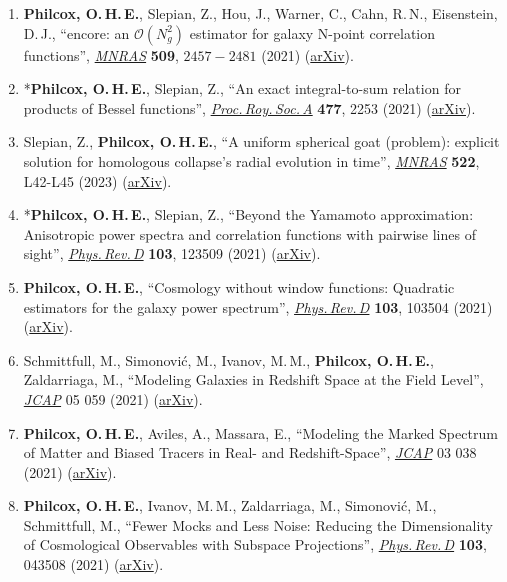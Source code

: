 \begin{enumerate}
    \item \textbf{Philcox, O.\,H.\,E.}, Slepian, Z., Hou, J., Warner, C., Cahn, R.\,N., Eisenstein, D.\,J., ``encore: an $\mathcal{O}(N_g^2)$ estimator for galaxy N-point correlation functions'', \href{https://doi.org/10.1093/mnras/stab3025}{\textit{MNRAS}} \textbf{509}, $2457-2481$ (2021) (\href{https://arxiv.org/abs/2105.08722}{arXiv}).
    \item *\textbf{Philcox, O.\,H.\,E.}, Slepian, Z., ``An exact integral-to-sum relation for products of Bessel functions'', \href{https://doi.org/10.1098/rspa.2021.0376}{\textit{Proc.\,Roy.\,Soc.\,A}} \textbf{477}, 2253 (2021) (\href{https://arxiv.org/abs/2104.10169}{arXiv}).
    \item Slepian, Z., \textbf{Philcox, O.\,H.\,E.}, ``A uniform spherical goat (problem): explicit solution for homologous collapse's radial evolution in time'', \href{https://doi.org/10.1093/mnrasl/slac153}{\textit{MNRAS}} \textbf{522}, L42-L45 (2023) (\href{https://arxiv.org/abs/2103.09823}{arXiv}).
    \item *\textbf{Philcox, O.\,H.\,E.}, Slepian, Z., ``Beyond the Yamamoto approximation: Anisotropic power spectra and correlation functions with pairwise lines of sight'', \href{https://doi.org/10.1103/PhysRevD.103.123509}{\textit{Phys.\,Rev.\,D}} \textbf{103}, 123509 (2021) (\href{https://arxiv.org/abs/2102.08384}{arXiv}).
    \item \textbf{Philcox, O.\,H.\,E.}, ``Cosmology without window functions: Quadratic estimators for the galaxy power spectrum'', \href{https://doi.org/10.1103/PhysRevD.103.103504}{\textit{Phys.\,Rev.\,D}} \textbf{103}, 103504 (2021) (\href{https://arxiv.org/abs/2012.09389}{arXiv}).
    \item Schmittfull, M., Simonovi\'c, M., Ivanov, M.\,M., \textbf{Philcox, O.\,H.\,E.}, Zaldarriaga, M., ``Modeling Galaxies in Redshift Space at the Field Level'', \href{https://doi.org/10.1088/1475-7516/2021/05/059}{\textit{JCAP}} 05 059 (2021) (\href{https://arxiv.org/abs/2012.03334}{arXiv}).
    \item \textbf{Philcox, O.\,H.\,E.}, Aviles, A., Massara, E., ``Modeling the Marked Spectrum of Matter and Biased Tracers in Real- and Redshift-Space'', \href{https://doi.org/10.1088/1475-7516/2021/03/038}{\textit{JCAP}} 03 038 (2021) (\href{https://arxiv.org/abs/2010.05914}{arXiv}).
    \item \textbf{Philcox, O.\,H.\,E.}, Ivanov, M.\,M., Zaldarriaga, M., Simonovi\'c, M., Schmittfull, M., ``Fewer Mocks and Less Noise: Reducing the Dimensionality of Cosmological Observables with Subspace Projections'', \href{https://doi.org/10.1103/PhysRevD.103.043508}{\textit{Phys.\,Rev.\,D}} \textbf{103}, 043508 (2021) (\href{https://arxiv.org/abs/2009.03311}{arXiv}).

\end{enumerate}
